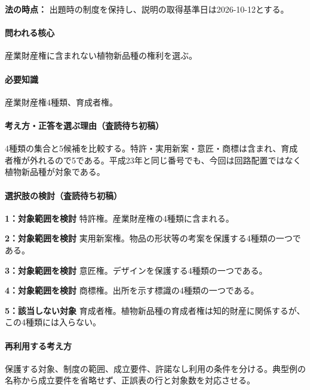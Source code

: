 \noindent\textbf{法の時点：} 出題時の制度を保持し、説明の取得基準日は2026-10-12とする。\par

\paragraph{問われる核心} 産業財産権に含まれない植物新品種の権利を選ぶ。

\paragraph{必要知識} 産業財産権4種類、育成者権。

\paragraph{考え方・正答を選ぶ理由（査読待ち初稿）} 4種類の集合と5候補を比較する。特許・実用新案・意匠・商標は含まれ、育成者権が外れるので5である。平成23年と同じ番号でも、今回は回路配置ではなく植物新品種が対象である。

\paragraph{選択肢の検討（査読待ち初稿）}\mbox{}\par

\noindent\textbf{1：対象範囲を検討} 特許権。産業財産権の4種類に含まれる。\par

\noindent\textbf{2：対象範囲を検討} 実用新案権。物品の形状等の考案を保護する4種類の一つである。\par

\noindent\textbf{3：対象範囲を検討} 意匠権。デザインを保護する4種類の一つである。\par

\noindent\textbf{4：対象範囲を検討} 商標権。出所を示す標識の4種類の一つである。\par

\noindent\textbf{5：該当しない対象} 育成者権。植物新品種の育成者権は知的財産に関係するが、この4種類には入らない。\par

\paragraph{再利用する考え方} 保護する対象、制度の範囲、成立要件、許諾なし利用の条件を分ける。典型例の名称から成立要件を省略せず、正誤表の行と対象数を対応させる。

